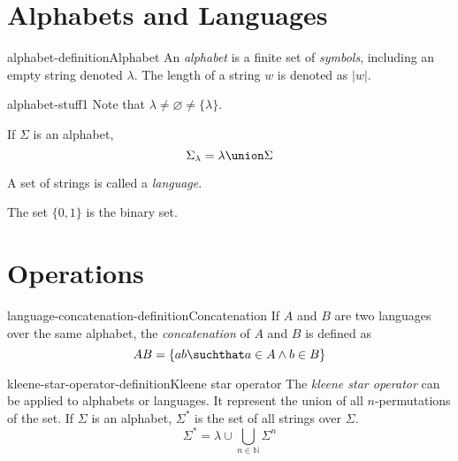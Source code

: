 \documentclass[preview]{standalone}
\newcommand{\emptyString}{\lambda}
\begin{document}
\genpage

\section{Alphabets and Languages}

\begin{snippetdefinition}{alphabet-definition}{Alphabet}
    An \textit{alphabet} is a finite set of \textit{symbols},
    including an empty string denoted \(\emptyString\).
    The length of a string \(w\) is denoted as \(|w|\).
\end{snippetdefinition}

\begin{snippet}{alphabet-stuff1}
    Note that \(\emptyString \neq \varnothing \neq \{\emptyString\}\).

    If \(\Sigma\) is an alphabet,
    \[
        \Sigma_\emptyString = \emptyString \union \Sigma
    \]

    A set of strings is called a \textit{language}.

    The set \(\{0,1\}\) is the binary set.
\end{snippet}

\section{Operations}

\begin{snippetdefinition}{language-concatenation-definition}{Concatenation}
    If \(A\) and \(B\) are two languages over the same alphabet,
    the \textit{concatenation} of \(A\) and \(B\) is defined as
    \[
        AB = \{ab \suchthat a \in A \land b \in B\}
    \]
\end{snippetdefinition}

\begin{snippetdefinition}{kleene-star-operator-definition}{Kleene star operator}
    The \textit{kleene star operator} can be applied to alphabets or languages.
    It represent the union of all \(n\)-permutations of the set.
    If \(\Sigma\) is an alphabet, \(\Sigma^*\) is the set of all strings over \(\Sigma\).
    \[
        \Sigma^* = \emptyString \cup \bigcup_{n\in\mathbb{N}} \Sigma^n
    \]
\end{snippetdefinition}

\end{document}
